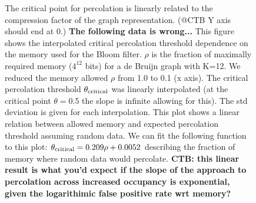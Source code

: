 \documentclass[12pt]{article} \usepackage{simplemargins}
\begin{document}
\begin{figure}
\caption{The critical point for percolation is linearly related to the
  compression factor of the graph representation.  (@CTB Y axis should end at 0.)
{\bf The following data is wrong... }This figure shows
  the interpolated critical percolation threshold dependence on the
  memory used for the Bloom filter. $\rho$ is the fraction of
  maximally required memory ($4^{12}$ bits) for a de Bruijn graph with
  K=12. We reduced the memory allowed $\rho$ from 1.0 to 0.1 (x
  axis). The critical percolation threshold $\theta_{\rm critical}$
  was linearly interpolated (at the critical point $\theta=0.5$ the
  slope is infinite allowing for this). The std deviation is given for
  each interpolation. This plot shows a linear relation between
  allowed memory and expected percolation threshold assuming random
  data. We can fit the following function to this plot: $\theta_{\rm
    critical} = 0.209 \rho + 0.0052$ describing the fraction of memory
  where random data would percolate.  {\bf CTB: this linear result is
    what you'd expect if the slope of the approach to percolation
    across increased occupancy is exponential, given the logarithimic
    false positive rate wrt memory?}}

\end{figure}

\end{document}
